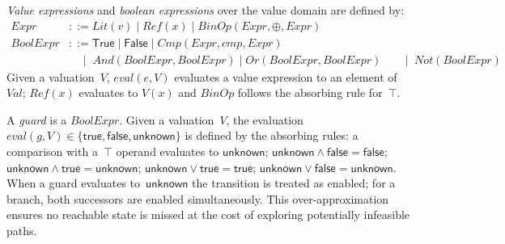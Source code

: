 \begin{definition}[Expressions]
\label{def:expressions}
\emph{Value expressions} and \emph{boolean expressions} over the value domain are defined by:
\begin{align*}
  \mathit{Expr} &::=
    \mathit{Lit}(v) \mid
    \mathit{Ref}(x) \mid
    \mathit{BinOp}(\mathit{Expr},\oplus,\mathit{Expr}) \\[4pt]
  \mathit{BoolExpr} &::=
    \textsf{True} \mid \textsf{False} \mid
    \mathit{Cmp}(\mathit{Expr},\mathit{cmp},\mathit{Expr}) \\
    &\quad\mid\;
    \mathit{And}(\mathit{BoolExpr},\mathit{BoolExpr}) \mid
    \mathit{Or}(\mathit{BoolExpr},\mathit{BoolExpr}) 
    &\quad\mid\;
    \mathit{Not}(\mathit{BoolExpr})
\end{align*}
Given a valuation~$V$, $\mathit{eval}(e,V)$ evaluates a value expression to an element of $\mathit{Val}$; $\mathit{Ref}(x)$ evaluates to $V(x)$ and $\mathit{BinOp}$ follows the absorbing rule for~$\top$.
\end{definition}

\begin{definition}
  \label{def:guard-eval}
  A \emph{guard} is a $\mathit{BoolExpr}$. Given a valuation~$V$, the evaluation $\mathit{eval}(g,V)\in\{\mathsf{true},\mathsf{false},\mathsf{unknown}\}$ is defined by the absorbing rules: a comparison with a~$\top$ operand evaluates to $\mathsf{unknown}$; $\mathsf{unknown}\wedge\mathsf{false}=\mathsf{false}$;\; $\mathsf{unknown}\wedge\mathsf{true}=\mathsf{unknown}$;\; $\mathsf{unknown}\vee\mathsf{true}=\mathsf{true}$;\; $\mathsf{unknown}\vee\mathsf{false}=\mathsf{unknown}$. When a guard evaluates to~$\mathsf{unknown}$ the transition is treated as enabled; for a branch, both successors are enabled   simultaneously. This over-approximation ensures no reachable state is missed at the cost of exploring potentially infeasible paths.
\end{definition}

